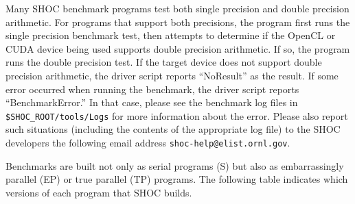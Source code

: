 \documentclass[11pt]{article}
\begin{document}
Many SHOC benchmark programs test both single precision and double precision
arithmetic.
For programs that support both precisions, the program first runs the
single precision benchmark test, then attempts to determine if the 
OpenCL or CUDA device being used supports double precision arithmetic.
If so, the program runs the double precision test.
If the target device does not support double precision arithmetic, the 
driver script reports ``NoResult'' as the result.
If some error occurred when running the benchmark, the driver script reports
``BenchmarkError.''
In that case, please see the benchmark log files in 
{\tt\$SHOC\_ROOT/tools/Logs} for more information about the error.
Please also report such situations (including the contents of the appropriate
log file) to the SHOC developers the following email address 
\verb+shoc-help@elist.ornl.gov+.

Benchmarks are built not only as serial programs (S) but also as 
embarrassingly parallel (EP) or true parallel (TP) programs. 
The following table indicates which versions of each program that 
SHOC builds.
\end{document}
